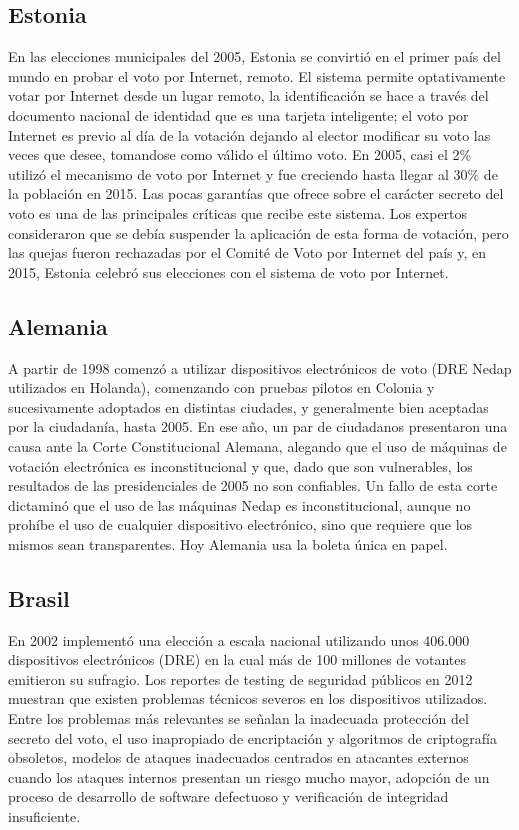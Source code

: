 \subsection{Estonia}
En las elecciones municipales del 2005, Estonia se convirtió en el primer país del mundo en probar el voto por Internet, remoto. El sistema permite optativamente votar por Internet desde un lugar remoto, la identificación se hace a través del documento nacional de identidad que es una tarjeta inteligente; el voto por Internet es previo al día de la votación dejando al elector modificar su voto las veces que desee, tomandose como válido el último voto. En 2005, casi el 2\% utilizó el mecanismo de voto por Internet y fue creciendo hasta llegar al 30\% de la población en 2015. Las pocas garantías que ofrece sobre el carácter secreto del voto es una de las principales críticas que recibe este sistema. Los expertos consideraron que se debía suspender la aplicación de esta forma de votación, pero las quejas fueron rechazadas por el Comité de Voto por Internet del país y, en 2015, Estonia celebró sus elecciones con el sistema de voto por Internet.\newline

\subsection{Alemania}
A partir de 1998 comenzó a utilizar dispositivos electrónicos de voto (DRE Nedap utilizados en Holanda), comenzando con pruebas pilotos en Colonia y sucesivamente adoptados en distintas ciudades, y generalmente bien aceptadas por la ciudadanía, hasta 2005. En ese año, un par de ciudadanos presentaron una causa ante la Corte Constitucional Alemana, alegando que el uso de máquinas de votación electrónica es inconstitucional y que, dado que son vulnerables, los resultados de las presidenciales de 2005 no son confiables. Un fallo de esta corte dictaminó que el uso de las máquinas Nedap es inconstitucional, aunque no prohíbe el uso de cualquier dispositivo electrónico, sino que requiere que los mismos sean transparentes. Hoy Alemania usa la boleta única en papel.

\subsection{Brasil}
En 2002 implementó una elección a escala nacional utilizando unos 406.000 dispositivos electrónicos (DRE) en la cual más de 100 millones de votantes emitieron su sufragio. Los reportes de testing de seguridad públicos en 2012 muestran que existen problemas técnicos severos en los dispositivos utilizados. Entre los problemas más relevantes se señalan la inadecuada protección del secreto del voto, el uso inapropiado de encriptación y algoritmos de criptografía obsoletos, modelos de ataques inadecuados centrados en atacantes externos cuando los ataques internos presentan un riesgo mucho mayor, adopción de un proceso de desarrollo de software defectuoso y verificación de integridad insuficiente.



